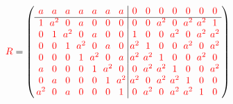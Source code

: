\documentclass{beamer}
\newcommand{\RR}[1]{\textcolor{red}{#1}}
\begin{document}
\begin{frame}
\end{frame}

\begin{frame}

    \[
      \RR{R}=
      \left(
        \arraycolsep=2.0pt\def\arraystretch{1.0}
        \begin{array}{ccccccc|ccccccc}
          \RR{a}&\RR{a}&\RR{a}&\RR{a}&\RR{a}&\RR{a}&\RR{a}&\RR{0}&\RR{0}&\RR{0}&\RR{0}&\RR{0}&\RR{0}&\RR{0}\\ \hline
          \RR{1}&\RR{a^2}&\RR{0}&\RR{a}&\RR{0}&\RR{0}&\RR{0}&\RR{0}&\RR{0}&\RR{a^2}&\RR{0}&\RR{a^2}&\RR{a^2}&\RR{1}\\
          \RR{0}&\RR{1}&\RR{a^2}&\RR{0}&\RR{a}&\RR{0}&\RR{0}&\RR{1}&\RR{0}&\RR{0}&\RR{a^2}&\RR{0}&\RR{a^2}&\RR{a^2}\\
          \RR{0}&\RR{0}&\RR{1}&\RR{a^2}&\RR{0}&\RR{a}&\RR{0}&\RR{a^2}&\RR{1}&\RR{0}&\RR{0}&\RR{a^2}&\RR{0}&\RR{a^2}\\
          \RR{0}&\RR{0}&\RR{0}&\RR{1}&\RR{a^2}&\RR{0}&\RR{a}&\RR{a^2}&\RR{a^2}&\RR{1}&\RR{0}&\RR{0}&\RR{a^2}&\RR{0}\\
          \RR{a}&\RR{0}&\RR{0}&\RR{0}&\RR{1}&\RR{a^2}&\RR{0}&\RR{0}&\RR{a^2}&\RR{a^2}&\RR{1}&\RR{0}&\RR{0}&\RR{a^2}\\
          \RR{0}&\RR{a}&\RR{0}&\RR{0}&\RR{0}&\RR{1}&\RR{a^2}&\RR{a^2}&\RR{0}&\RR{a^2}&\RR{a^2}&\RR{1}&\RR{0}&\RR{0}\\
          \RR{a^2}&\RR{0}&\RR{a}&\RR{0}&\RR{0}&\RR{0}&\RR{1}&\RR{0}&\RR{a^2}&\RR{0}&\RR{a^2}&\RR{a^2}&\RR{1}&\RR{0}\\
        \end{array}
      \right)
    \]

\end{frame}
\end{document}
